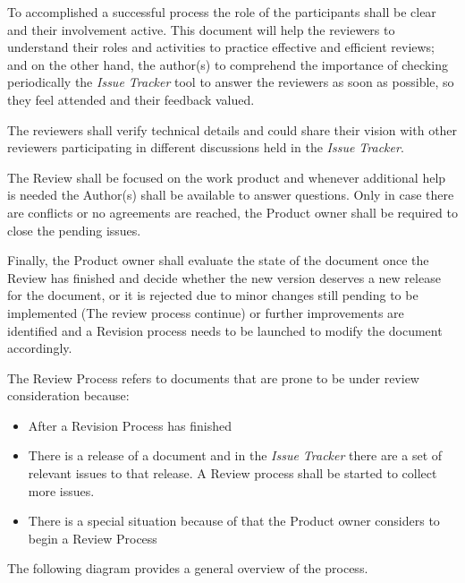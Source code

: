\documentclass{template/openetcs_article}
\begin{document}
To accomplished a successful process the role of the participants shall be clear and their involvement active. This document will help the reviewers to understand their roles and
activities to practice effective and efficient reviews; and on the other hand, the author(s) to comprehend the importance of checking periodically the {\it Issue Tracker} tool to answer the reviewers as soon as possible, so they feel attended and their feedback valued.

The reviewers shall verify technical details and could share their vision with other reviewers participating in different discussions held in the {\it Issue Tracker}. 

The Review shall be focused on the work product and whenever additional help is needed the Author(s) shall be available to answer questions. Only in case there are conflicts or no agreements are reached, the Product owner shall be required to close the pending issues.

Finally, the Product owner shall evaluate the state of the document once the Review has finished and decide whether the new version deserves a new release for the document, or it is rejected due to minor changes still pending to be implemented (The review process continue) or further improvements are identified and a Revision process needs to be launched to modify the document accordingly.

The Review Process refers to documents that are prone to be under review consideration because:

\begin{itemize}
\item After a Revision Process has finished
\item There is a release of a document and in the {\it Issue Tracker} there are a set of relevant issues to that release. A Review process shall be started to collect more issues.
\item There is a special situation because of that the Product owner considers to begin a Review Process 
\end{itemize}

The following diagram provides a general overview of the process. 
\end{document}
